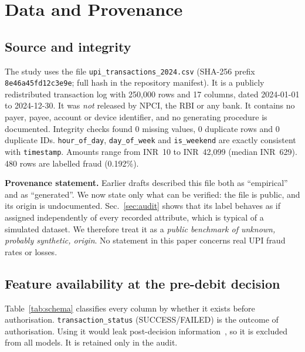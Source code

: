 \documentclass[conference]{IEEEtran}
\newcommand{\inr}{INR~}
\begin{document}
\section{Data and Provenance}\label{sec:data}
\subsection{Source and integrity}
The study uses the file \texttt{upi\_transactions\_2024.csv} (SHA-256 prefix \texttt{8e46a45fd12c3e9e}; full hash in the repository manifest). It is a publicly redistributed transaction log with 250,000 rows and 17 columns, dated 2024-01-01 to 2024-12-30. It was \emph{not} released by NPCI, the RBI or any bank. It contains no payer, payee, account or device identifier, and no generating procedure is documented. Integrity checks found 0 missing values, 0 duplicate rows and 0 duplicate IDs. \texttt{hour\_of\_day}, \texttt{day\_of\_week} and \texttt{is\_weekend} are exactly consistent with \texttt{timestamp}. Amounts range from \inr10 to \inr42,099 (median \inr629). 480 rows are labelled fraud (0.192\%).

\textbf{Provenance statement.} Earlier drafts described this file both as ``empirical'' and as ``generated''. We now state only what can be verified: the file is public, and its origin is undocumented. Sec.~\ref{sec:audit} shows that its label behaves as if assigned independently of every recorded attribute, which is typical of a simulated dataset. We therefore treat it as a \emph{public benchmark of unknown, probably synthetic, origin}. No statement in this paper concerns real UPI fraud rates or losses.

\subsection{Feature availability at the pre-debit decision}
Table~\ref{tab:schema} classifies every column by whether it exists before authorisation. \texttt{transaction\_status} (SUCCESS/FAILED) is the outcome of authorisation. Using it would leak post-decision information~\cite{kaufman2012}, so it is excluded from all models. It is retained only in the audit.
\end{document}
